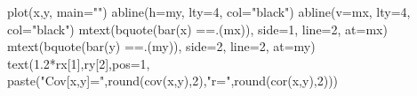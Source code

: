 \begin{Schunk}
\begin{Sinput}
 plot(x,y, main="")
 abline(h=my, lty=4, col="black")
 abline(v=mx, lty=4, col="black")
 mtext(bquote(bar(x) ==.(mx)), side=1, line=2, at=mx)
 mtext(bquote(bar(y) ==.(my)), side=2, line=2, at=my)
 text(1.2*rx[1],ry[2],pos=1, paste("Cov[x,y]=",round(cov(x,y),2),"\n r=",round(cor(x,y),2)))
\end{Sinput}
\end{Schunk}
